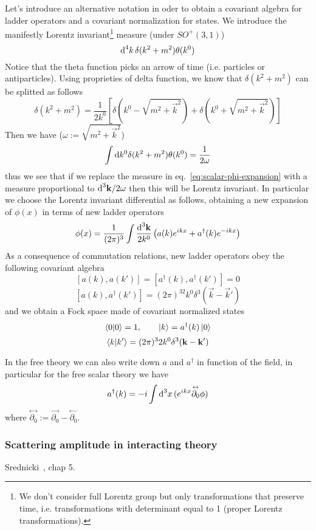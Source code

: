 \documentclass[../main/main.tex]{subfiles}
\begin{document}
Let's introduce an alternative notation in oder to obtain a covariant algebra for ladder operators and a covariant normalization for states.
We introduce the manifestly Lorentz invariant\footnote{We don't consider full Lorentz group but only transformations that preserve time, i.e. transformations with determinant equal to 1 (proper Lorentz transformations).} measure (under $SO^+(3,1)$)
\[\textup{d}^4k\,\delta(k^2+m^2)\theta(k^0)\]
Notice that the theta function picks an arrow of time (i.e. particles or antiparticles).
Using proprieties of delta function, we know that $\delta(k^2+m^2)$ can be splitted as follows
\[\delta (k^2+m^2)=\frac1{2k^0}\left[\delta\left(k^0-\sqrt{m^2+\vec k^2}\right)+\delta\left(k^0+\sqrt{m^2+\vec k^2}\right)\right]\]
Then we have ($\omega:=\sqrt{m^2+\vec k^2}$)
\[\int\textup{d} k^0\delta(k^2+m^2)\theta(k^0)=\frac1{2\omega}\]
thus we see that if we replace the measure in eq.~\eqref{eq:scalar-phi-expansion} with a measure proportional to $\textup{d}^3\mathbf k/2\omega$ then this will be Lorentz invariant. In particular we choose the Lorentz invariant differential as follows, obtaining a new expansion of $\phi(x)$ in terms of new ladder operators
\begin{align*}
\phi(x)=\frac1{(2\pi)^3}\int\frac{\textup{d}^3 \mathbf k}{2k^0}\left(a(k)e^{ikx}+a^\dagger(k)e^{-ikx}\right)
\end{align*}
As a consequence of commutation relations, new ladder operators obey the following covariant algebra
\[[a(k),a(k')]=[a^\dagger(k),a^\dagger(k')]=0\]
\[[a(k),a^\dagger(k')]=(2\pi)^32k^0\delta^3(\vec k-\vec k')\]
and we obtain a Fock space made of covariant normalized states
\[\braket0=1,\qquad\ket k=a^\dagger(k)\ket0\]
\[\braket{k}{k'}=(2\pi)^32k^0\delta^3(\mathbf k-\mathbf k')\]

In the free theory we can also write down $a$ and $a^\dagger$ in function of the field, in particular for the free scalar theory we have
\begin{equation}\label{eqn:ladder-field-relation}
a^\dagger(k)=-i\int\textup{d}^3x\,(e^{ikx}\overset{\leftrightarrow}{\partial_0}\phi)
\end{equation}
where $\overset{\leftrightarrow}{\partial_0}:=\overset{\rightarrow}{\partial_0}-\overset{\leftarrow}{\partial_0}$.

\subsubsection{Scattering amplitude in interacting theory}
\textsf{Srednicki~\cite{Srednicki:2007aa}, chap 5}.\\
\end{document}
